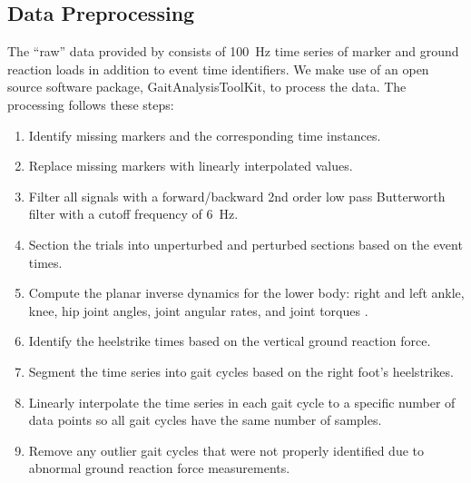 \documentclass{article}
\begin{document}
\subsection*{Data Preprocessing}
%
The ``raw'' data provided by \cite{Moore2015} consists of 100~\si{\hertz} time
series of marker and ground reaction loads in addition to event time
identifiers. We make use of an open source software package,
GaitAnalysisToolKit, to process the data. The processing follows these steps:
%
\begin{enumerate}
  \item Identify missing markers and the corresponding time instances.
  \item Replace missing markers with linearly interpolated values.
  \item Filter all signals with a forward/backward 2nd order low pass
    Butterworth filter with a cutoff frequency of 6~\si{\hertz}.
  \item Section the trials into unperturbed and perturbed sections based on the
    event times.
  \item Compute the planar inverse dynamics for the lower body: right and left
    ankle, knee, hip joint angles, joint angular rates, and joint torques
    \cite{Winter2009}.
  \item Identify the heelstrike times based on the vertical ground reaction
    force.
  \item Segment the time series into gait cycles based on the right foot's
    heelstrikes.
  \item Linearly interpolate the time series in each gait cycle to a specific
    number of data points so all gait cycles have the same number of samples.
  \item Remove any outlier gait cycles that were not properly identified due to
    abnormal ground reaction force measurements.
\end{enumerate}
\end{document}
